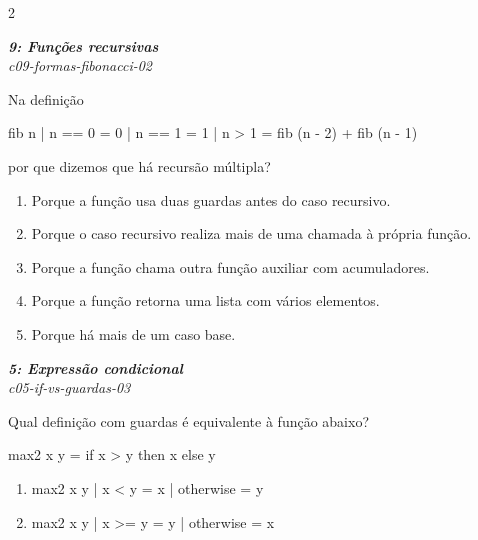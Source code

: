 \documentclass[a4paper,10pt,brazil]{article}
\begin{document}
\begin{multicols}{2}
\begin{enumerate}
\end{enumerate}

\begin{flushright}
  \footnotesize
  \textit{\textbf{9: Funções recursivas}}\\
  \textit{c09-formas-fibonacci-02}\\

\end{flushright}
Na definição
\begin{haskellcode}
fib n
  | n == 0 = 0
  | n == 1 = 1
  | n > 1  = fib (n - 2) + fib (n - 1)
\end{haskellcode}
por que dizemos que há recursão múltipla?

\begin{enumerate}
  \item Porque a função usa duas guardas antes do caso recursivo.

  \item Porque o caso recursivo realiza mais de uma chamada à própria função.

  \item Porque a função chama outra função auxiliar com acumuladores.

  \item Porque a função retorna uma lista com vários elementos.

  \item Porque há mais de um caso base.


\end{enumerate}

\begin{flushright}
  \footnotesize
  \textit{\textbf{5: Expressão condicional}}\\
  \textit{c05-if-vs-guardas-03}\\

\end{flushright}
Qual definição com guardas é equivalente à função abaixo?
\begin{haskellcode}
max2 x y = if x > y then x else y
\end{haskellcode}

\begin{enumerate}
  \item \begin{haskellcode}
max2 x y
  | x < y     = x
  | otherwise = y
\end{haskellcode}

  \item \begin{haskellcode}
max2 x y
  | x >= y    = y
  | otherwise = x
\end{haskellcode}


\end{enumerate}
\end{multicols}
\end{document}
